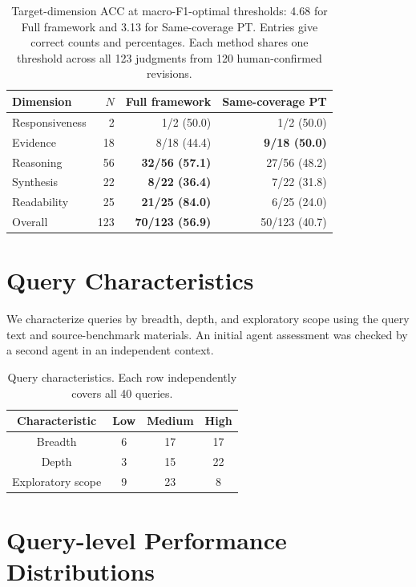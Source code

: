 \documentclass{article}
\begin{document}
\begin{table}[t]
\centering\small\setlength{\tabcolsep}{6pt}
\begin{tabular}{@{}lrrr@{}}
\toprule
Dimension & $N$ & Full framework & Same-coverage PT \\
\midrule
Responsiveness & 2 & 1/2 (50.0) & 1/2 (50.0) \\
Evidence & 18 & 8/18 (44.4) & \textbf{9/18 (50.0)} \\
Reasoning & 56 & \textbf{32/56 (57.1)} & 27/56 (48.2) \\
Synthesis & 22 & \textbf{8/22 (36.4)} & 7/22 (31.8) \\
Readability & 25 & \textbf{21/25 (84.0)} & 6/25 (24.0) \\
\midrule
Overall & 123 & \textbf{70/123 (56.9)} & 50/123 (40.7) \\
\bottomrule
\end{tabular}
\caption{Target-dimension ACC at macro-F1-optimal thresholds: 4.68 for Full framework and 3.13 for Same-coverage PT. Entries give correct counts and percentages. Each method shares one threshold across all 123 judgments from 120 human-confirmed revisions.}
\label{tab:controlled_dimensions}
\end{table}

\section{Query Characteristics}
\label{app:query_characteristics}
We characterize queries by breadth, depth, and exploratory scope using the query text and source-benchmark materials. An initial agent assessment was checked by a second agent in an independent context.

\begin{table}[t]
\centering
\small


\begin{tabular}{cccc}
\hline
Characteristic & Low & Medium & High \\
\hline
Breadth & 6 & 17 & 17 \\
Depth & 3 & 15 & 22 \\
Exploratory scope & 9 & 23 & 8 \\
\hline
\end{tabular}
\caption{Query characteristics. Each row independently covers all 40 queries.}
\label{tab:query_characteristics}
\end{table}


\section{Query-level Performance Distributions}
\label{app:score_distributions}
\end{document}
